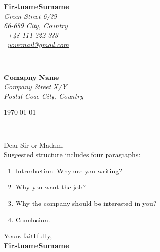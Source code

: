 \documentclass[11pt]{article}
\def\firstname{Firstname}
\def\familyname{Surname}
\def\FileAuthor{\firstname\space\familyname}
\begin{document}
\hfill%
\begin{minipage}[t]{.6\textwidth}
\raggedleft%
{\bfseries \FileAuthor}\\[.35ex]
\small\itshape%
Green Street 6/39\\
66-689 City, Country\\[.35ex]
\Mobilefone~+48 111 222 333\\
\Letter~\href{mailto:yourmail@gmail.com}{yourmail@gmail.com}
\end{minipage}\\[1em]
%
\begin{minipage}[t]{.4\textwidth}
\raggedright%
{\bfseries Comapny Name}\\[.35ex]
\small\itshape%
Company Street X/Y\\
Postal-Code City, Country
\end{minipage}
\hfill %
\begin{minipage}[t]{.4\textwidth}
\raggedleft %
\today
\end{minipage}\\[2em]
\raggedright
Dear Sir or Madam,\\[1.5em]
%
Suggested structure includes four paragraphs:
\begin{enumerate}
	\item{Introduction. Why are you writing?}
	\item{Why you want the job?}
	\item{Why the company should be interested in you?}
	\item{Conclusion.}
\end{enumerate}

Yours faithfully,\\[2em] %
%
{\bfseries \FileAuthor}\\
%
\end{document}
